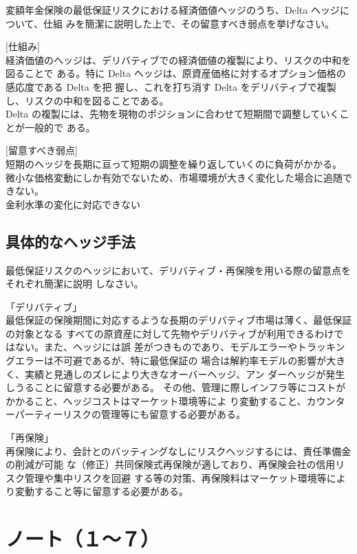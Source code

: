 \documentclass[report,gutter=10mm,fore-edge=10mm,uplatex,dvipdfmx]{jlreq}
\begin{document}
{
変額年金保険の最低保証リスクにおける経済価値ヘッジのうち、Delta ヘッジについて、仕組
みを簡潔に説明した上で、その留意すべき弱点を挙げなさい。
\answer{}

[仕組み]\\
経済価値のヘッジは、デリバティブでの経済価値の複製により、リスクの中和を図ることで
ある。特に Delta ヘッジは、原資産価格に対するオプション価格の感応度である Delta を把
握し、これを打ち消す Delta をデリバティブで複製し、リスクの中和を図ることである。\\
Delta の複製には、先物を現物のポジションに合わせて短期間で調整していくことが一般的で
ある。

[留意すべき弱点]\\
短期のヘッジを長期に亘って短期の調整を繰り返していくのに負荷がかかる。\\
微小な価格変動にしか有効でないため、市場環境が大きく変化した場合に追随できない。\\
金利水準の変化に対応できない

\subsection{具体的なヘッジ手法}
最低保証リスクのヘッジにおいて、デリバティブ・再保険を用いる際の留意点をそれぞれ簡潔に説明
しなさい。
\answer{}

「デリバティブ」\\
最低保証の保険期間に対応するような長期のデリバティブ市場は薄く、最低保証の対象となる
すべての原資産に対して先物やデリバティブが利用できるわけではない。また、ヘッジには誤
差がつきものであり、モデルエラーやトラッキングエラーは不可避であるが、特に最低保証の
場合は解約率モデルの影響が大きく、実績と見通しのズレにより大きなオーバーヘッジ、アン
ダーヘッジが発生しうることに留意する必要がある。
その他、管理に際しインフラ等にコストがかかること、ヘッジコストはマーケット環境等によ
り変動すること、カウンターパーティーリスクの管理等にも留意する必要がある。

「再保険」\\
再保険により、会計とのバッティングなしにリスクヘッジするには、責任準備金の削減が可能
な（修正）共同保険式再保険が適しており、再保険会社の信用リスク管理や集中リスクを回避
する等の対策、再保険料はマーケット環境等により変動すること等に留意する必要がある。

\section{ノート（１～７）}
}
\end{document}

